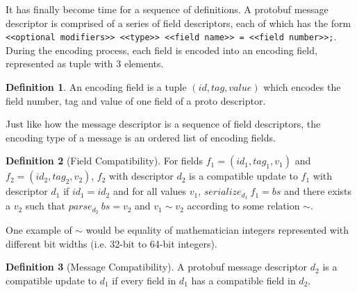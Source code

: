 \documentclass[11pt]{article}
\theoremstyle{definition}
\newtheorem{definition}{Definition}[section]
\begin{document}
It has finally become time for a sequence of definitions. A protobuf message
descriptor is comprised of a series of field descriptors, each of which has the
form \texttt{<<optional modifiers>> <<type>> <<field name>> = <<field
	number>>;}. During the encoding process, each field is encoded into an
encoding field, represented as tuple with 3 elements.

\begin{definition}
	An encoding field is a tuple $(id, tag, value)$ which encodes the field
	number, tag and value of one field of a proto descriptor.
\end{definition}

Just like how the message descriptor is a sequence of field descriptors, the
encoding type of a message is an ordered list of encoding fields.

\begin{definition}[Field Compatibility]
	For fields $f_1 = (id_1, tag_1, v_1)$ and $f_2 = (id_2, tag_2, v_2)$, $f_2$
	with descriptor $d_2$ is a compatible update to $f_1$ with descriptor $d_1$ if
	$id_1 = id_2$ and for all values $v_1$, $serialize_{d_1}\ f_1 = bs$ and there
	exists a $v_2$ such that $parse_{d_2}\ bs = v_2$ and $v_1 \sim v_2$ according to
	some relation $\sim$.
\end{definition}

One example of $\sim$ would be equality of mathematician integers represented with
different bit widths (i.e. 32-bit to 64-bit integers).

\begin{definition}[Message Compatibility]
	A protobuf message descriptor $d_2$ is a compatible update to $d_1$ if every
	field in $d_1$ has a compatible field in $d_2$.
\end{definition}

\printbibliography{}
\end{document}
